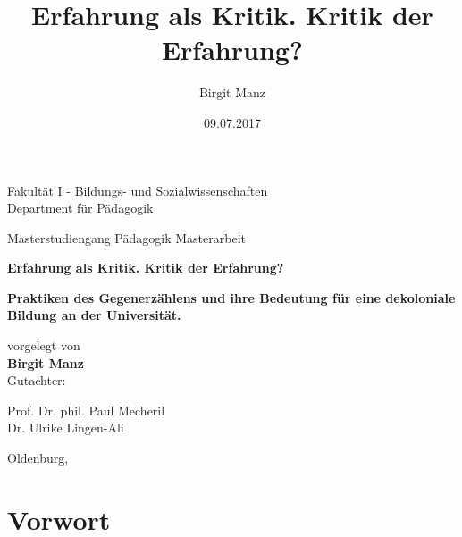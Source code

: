 \documentclass[11pt]{article}
\title{Erfahrung als Kritik. Kritik der Erfahrung?}
\author{Birgit Manz}
\begin{document}
\begin{titlepage}
 
 \begin{center}

  \begin{sffamily}
    Fakultät I - Bildungs- und Sozialwissenschaften \\[0.1em]
    Department für Pädagogik \\
  \end{sffamily}
  \vspace*{0.5cm}
  Masterstudiengang Pädagogik
  \vspace*{0.5cm}
  Masterarbeit

  \begin{sffamily}
    \huge \bfseries Erfahrung als Kritik. Kritik der Erfahrung?\\[0.75em]
  \end{sffamily}
 
  \begin{sffamily}
    \large \bfseries Praktiken des Gegenerzählens und ihre Bedeutung für eine
    dekoloniale Bildung an der Universität. \\[1em]
  \end{sffamily}

  vorgelegt von \\[0.75em]
  \large \textbf{Birgit Manz} \\[1em]
\vspace*{1cm}
Gutachter: \\[0.75em]
  \begin{bfseries}
Prof. Dr. phil. Paul Mecheril
    \\[0.2em]
Dr. Ulrike Lingen-Ali
 \end{bfseries}

  \vspace*{1.2cm}



  Oldenburg,
  \date{09.07.2017}

  \vfill


\end{center} 
\end{titlepage}


\section{Vorwort}

\setlength{\epigraphwidth}{0.7\textwidth}
\end{document}
